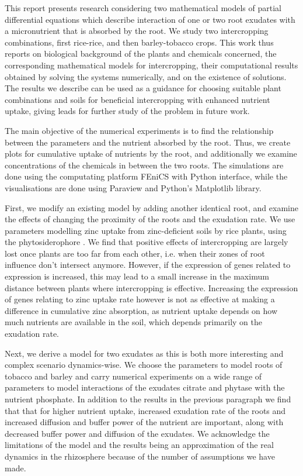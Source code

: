 \documentclass[11pt]{article}
\numberwithin{equation}{section}
\begin{document}
This report presents research considering two mathematical models of partial differential equations which describe interaction of one or two root exudates with a micronutrient that is absorbed by the root. We study two intercropping combinations, first rice-rice, and then barley-tobacco crops. This work thus reports on biological background of the plants and chemicals concerned, the corresponding mathematical models for intercropping, their computational results obtained by solving the systems numerically, and on the existence of solutions. The results we describe can be used as a guidance for choosing suitable plant combinations and soils for beneficial intercropping with enhanced nutrient uptake, giving leads for further study of the problem in future work. 

The main objective of the numerical experiments is to find the relationship between the parameters and the nutrient absorbed by the root. Thus, we create plots for cumulative uptake of nutrients by the root, and additionally we examine concentrations of the chemicals in between the two roots. The simulations are done using the computating platform FEniCS with Python interface, while the visualisations are done using Paraview and Python's Matplotlib library.

First, we modify an existing model by adding another identical root, and examine the effects of changing the proximity of the roots and the exudation rate. We use parameters modelling zinc uptake from zinc-deficient soils by rice plants, using the phytosiderophore . We find that positive effects of intercropping are largely lost once plants are too far from each other, i.e. when their zones of root influence don't intersect anymore.
However, if the expression of genes related to  expression is increased, this may lead to a small increase in the maximum distance between plants where intercropping is effective. Increasing the expression of genes relating to zinc uptake rate however is not as effective at making a difference in cumulative zinc absorption, as nutrient uptake depends on how much nutrients are available in the soil, which depends primarily on the exudation rate.

Next, we derive a model for two exudates as this is both more interesting and complex scenario dy\-na\-mics-wise. We choose the parameters to model roots of tobacco and barley and carry numerical experiments on a wide range of parameters to model interactions of the exudates citrate and phytase with the nutrient phosphate. In addition to the results in the previous paragraph we find that that for higher nutrient uptake, increased exudation rate of the roots and increased diffusion and buffer power of the nutrient are important, along with decreased buffer power and diffusion of the exudates. We acknowledge the limitations of the model and the results being an approximation of the real dynamics in the rhizosphere because of the number of assumptions we have made.
\end{document}
